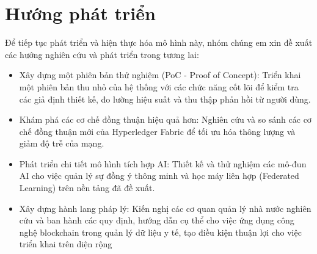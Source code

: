 \documentclass[../DoAn.tex]{subfiles}
\begin{document}
\section{Hướng phát triển}
Để tiếp tục phát triển và hiện thực hóa mô hình này, nhóm chúng em xin đề xuất các hướng nghiên cứu và phát triển trong tương lai:
\begin{itemize}
    \item Xây dựng một phiên bản thử nghiệm (PoC - Proof of Concept): Triển khai một phiên bản thu nhỏ của hệ thống với các chức năng cốt lõi để kiểm tra các giả định thiết kế, đo lường hiệu suất và thu thập phản hồi từ người dùng.
    \item Khám phá các cơ chế đồng thuận hiệu quả hơn: Nghiên cứu và so sánh các cơ chế đồng thuận mới của Hyperledger Fabric để tối ưu hóa thông lượng và giảm độ trễ của mạng.
    \item Phát triển chi tiết mô hình tích hợp AI: Thiết kế và thử nghiệm các mô-đun AI cho việc quản lý sự đồng ý thông minh và học máy liên hợp (Federated Learning) trên nền tảng đã đề xuất.
    \item Xây dựng hành lang pháp lý: Kiến nghị các cơ quan quản lý nhà nước nghiên cứu và ban hành các quy định, hướng dẫn cụ thể cho việc ứng dụng công nghệ blockchain trong quản lý dữ liệu y tế, tạo điều kiện thuận lợi cho việc triển khai trên diện rộng
\end{itemize}
\end{document}
